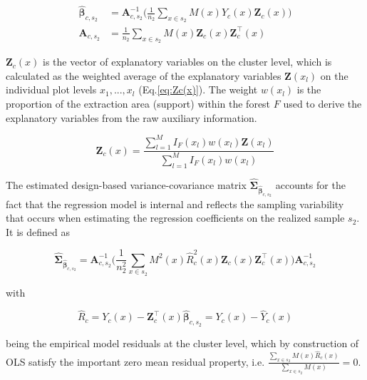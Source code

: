 \documentclass[remotesensing,article,submit,moreauthors,pdftex,10pt,a4paper]{mdpi}
\begin{document}
\begin{subequations}\label{normequ_simple_cluster}
	\begin{align}
	\hat{\pmb{\beta}}_{c,s_2} &= \pmb{A}_{c,s_2}^{-1} \Big(\frac{1}{n_2}\sum_{x\in{s_2}}M(x)Y_{c}(x)\pmb{Z}_{c}(x)\Big) \\
	\pmb{A}_{c,s_2} &=\frac{1}{n_2}\sum_{x\in{s_2}}M(x)\pmb{Z}_{c}(x)\pmb{Z}_{c}^{\top}(x)
	\end{align}
\end{subequations}

\noindent $\pmb{Z}_{c}(x)$ is the vector of explanatory variables on the cluster level, which is calculated as the weighted average of the explanatory variables $\pmb{Z}(x_l)$ on the individual plot levels $x_1, ..., x_l$ (Eq.\ref{eq:Zc(x)}). The weight $w(x_l)$ is the proportion of the extraction area (support) within the forest $F$ used to derive the explanatory variables from the raw auxiliary information.

\begin{equation}\label{eq:Zc(x)}
\pmb{Z}_{c}(x)=\frac{\sum_{l=1}^{M}I_{F}(x_l)w(x_l)\pmb{Z}(x_l)}{\sum_{l=1}^{M}I_{F}(x_l)w(x_l)}
\end{equation}

\noindent The estimated design-based variance-covariance matrix $\hat{\pmb{\Sigma}}_{\hat{\pmb{\beta}}_{c,s_2}}$ accounts for the fact that the regression model is internal and reflects the sampling variability that occurs when estimating the regression coefficients on the realized sample $s_2$. It is defined as

\begin{equation}\label{eq:varcovarbeta}
\hat{\pmb{\Sigma}}_{\hat{\pmb{\beta}}_{c,s_2}}=\pmb{A}_{c,s_2}^{-1}
\Big(\frac{1}{n_2^2}\sum_{x\in{s_2}}M^{2}(x)\hat{R}_{c}^2(x)\pmb{Z}_{c}(x)\pmb{Z}_{c}^{\top}(x)\Big)
\pmb{A}_{c,s_2}^{-1}
\end{equation}

\noindent with 

\begin{equation}\label{eq:globresids}
\hat{R}_{c}=Y_{c}(x)-\pmb{Z}_{c}^{\top}(x)\hat{\pmb{\beta}}_{c,s_2} = Y_{c}(x) - \hat{Y}_{c}(x)
\end{equation}

\noindent being the empirical model residuals at the cluster level, which by construction of OLS satisfy the important zero mean residual property, i.e. $\frac{\sum_{x \in s_{2}} M(x) \hat{R}_{c}(x)}{\sum_{x \in s_{2}} M(x)}=0$.\\
\end{document}
